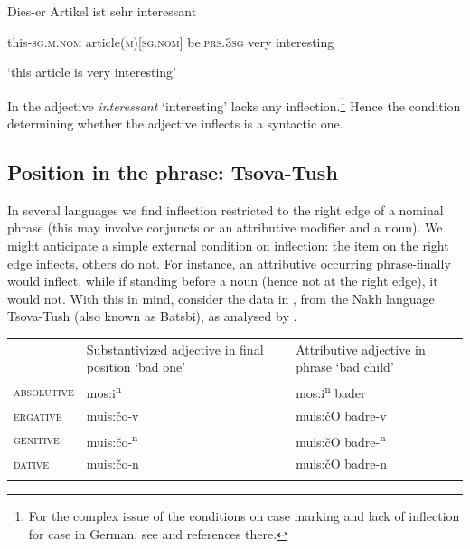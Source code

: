 \documentclass[output=paper]{langscibook}
\begin{document}
          Dies-er  Artikel  ist  sehr  interessant 

  this\textsc{{}-sg.m.nom}  article(\textsc{m)[sg.nom]}  be.\textsc{prs}.\textsc{3sg}  very  interesting

‘this article is very interesting’

In  the adjective \textit{interessant} ‘interesting’ lacks any inflection.\footnote{ \textrm{For the complex issue of the conditions on case marking and lack of inflection for case in German, see \citet{Spencer2009} and references there.} } Hence the condition determining whether the adjective inflects is a syntactic one. 

\subsection{\textbf{Position} \textbf{in} \textbf{the} \textbf{phrase:} \textbf{Tsova-Tush}}

In several languages we find inflection restricted to the right edge of a nominal phrase (this may involve conjuncts or an attributive modifier and a noun). We might anticipate a simple external condition on inflection: the item on the right edge inflects, others do not. For instance, an attributive occurring phrase-finally would inflect, while if standing before a noun (hence not at the right edge), it would not. With this in mind, consider the data in , from the Nakh language Tsova-Tush (also known as Batsbi), as analysed by \citet{Sims-WilliamsBaerman2021}. 


\begin{tabularx}{\textwidth}{XXX}

\lsptoprule
\multicolumn{1}{c}{} & Substantivized adjective in final position ‘bad one’ & Attributive adjective in phrase ‘bad child’\\
\textsc{absolutive} & mos:i\textsuperscript{n} & mos:i\textsuperscript{n}   bader\\
\textsc{ergative} & muis:čo-v & muis:čO  badre-v\\
\textsc{genitive} & muis:čo-\textsuperscript{n} & muis:čO  badre-\textsuperscript{n}\\
\textsc{dative} & muis:čo-n & muis:čO   badre-n\\
\lspbottomrule
\end{tabularx}
\begin{table}
\caption{ Tsova-Tush (bbl, \citealt{HoliskyGagua1994}: 171-172, \citealt{Sims-WilliamsBaerman2021}: 28)}
\label{tab:key:10}
\end{table}
\end{document}
